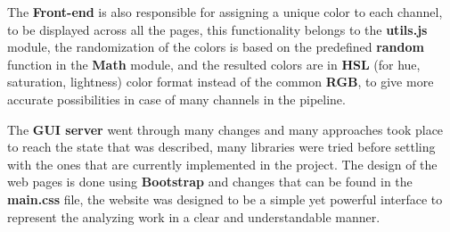 The \textbf{Front-end} is also responsible for assigning a unique color to each channel, to be
displayed across all the pages, this functionality belongs to the \textbf{utils.js} module, the
randomization of the colors is based on the predefined \textbf{random} function
in the \textbf{Math} module, and the resulted colors are in \textbf{HSL} (for hue, saturation, lightness) 
color format instead of the common \textbf{RGB}, to give more accurate possibilities in case of
many channels in the pipeline.

The \textbf{GUI server} went through many changes and many approaches took place to
reach the state that was described, many libraries were tried before settling with the
ones that are currently implemented in the project. The design of the web pages is done using
\textbf{Bootstrap}\cite{bootstrap} and changes that can be found in the \textbf{main.css} file, the website was
designed to be a simple yet powerful interface to represent the analyzing work in a clear and
understandable manner.